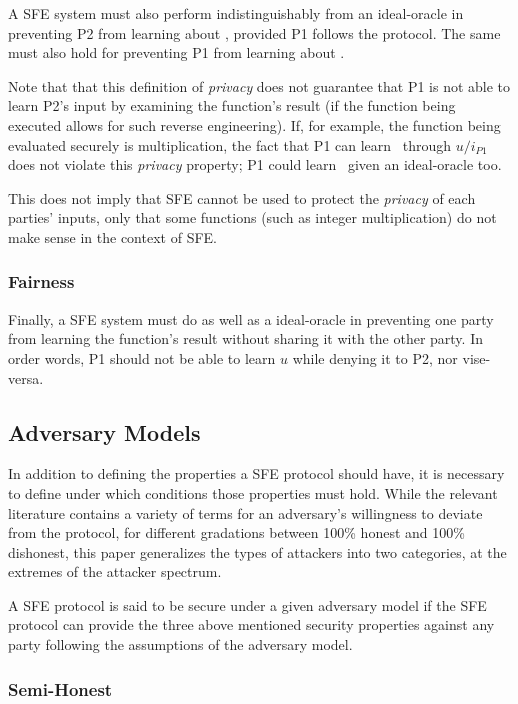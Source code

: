 A \ac{SFE} system must also perform indistinguishably from an ideal-oracle in preventing \ac{P2} from learning about \ponein, provided \ac{P1} follows the protocol.  The same must also hold for preventing \ac{P1} from learning about \ptwoin.

Note that that this definition of \emph{privacy} does not guarantee that \ac{P1} is not able to learn \ac{P2}'s input by examining the function's result (if the function being executed allows for such reverse engineering).  If, for example, the function being evaluated securely is multiplication, the fact that \ac{P1} can learn \ptwoin\ through $u/i_{P1}$ does not violate this \emph{privacy} property; \ac{P1} could learn \ptwoin\ given an ideal-oracle too.

This does not imply that \ac{SFE} cannot be used to protect the \emph{privacy} of each parties' inputs, only that some functions (such as integer multiplication) do not make sense in the context of \ac{SFE}.

\subsubsection{Fairness}

Finally, a \ac{SFE} system must do as well as a ideal-oracle in preventing one party  from learning the function's result without sharing it with the other party. In order words, \ac{P1} should not be able to learn $u$ while denying it to \ac{P2}, nor vise-versa.

\subsection{Adversary Models}

In addition to defining the properties a \ac{SFE} protocol should have, it is necessary to define under which conditions those properties must hold.  While the relevant literature contains a variety of terms for an adversary's willingness to deviate from the protocol, for different gradations between 100\% honest and 100\% dishonest, this paper generalizes the types of attackers into two categories, at the extremes of the attacker spectrum.

A \ac{SFE} protocol is said to be secure under a given adversary model if the \ac{SFE} protocol can provide the three above mentioned security properties against any party following the assumptions of the adversary model.


\subsubsection{Semi-Honest}

